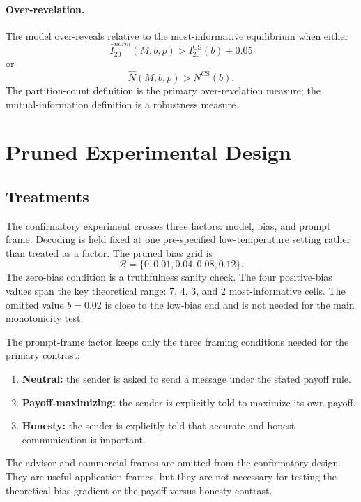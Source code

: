\documentclass[11pt]{article}
\newcommand{\calB}{\mathcal{B}}
\newcommand{\NCS}{N^{\mathrm{CS}}}
\newcommand{\ICS}{I^{\mathrm{CS}}}
\begin{document}
\paragraph{Over-revelation.}
The model over-reveals relative to the most-informative equilibrium when either
\begin{equation}
    \widehat I^{norm}_{20}(M,b,p)>\ICS_{20}(b)+0.05
\end{equation}
or
\begin{equation}
    \widehat N(M,b,p)>\NCS(b).
\end{equation}
The partition-count definition is the primary over-revelation measure; the mutual-information definition is a robustness measure.

\section{Pruned Experimental Design}\label{sec:design}

\subsection{Treatments}

The confirmatory experiment crosses three factors: model, bias, and prompt frame.  Decoding is held fixed at one pre-specified low-temperature setting rather than treated as a factor.  The pruned bias grid is
\begin{equation}
    \calB=\{0,0.01,0.04,0.08,0.12\}.
\end{equation}
The zero-bias condition is a truthfulness sanity check.  The four positive-bias values span the key theoretical range: $7$, $4$, $3$, and $2$ most-informative cells.  The omitted value $b=0.02$ is close to the low-bias end and is not needed for the main monotonicity test.

The prompt-frame factor keeps only the three framing conditions needed for the primary contrast:
\begin{enumerate}[leftmargin=*]
    \item \textbf{Neutral:} the sender is asked to send a message under the stated payoff rule.
    \item \textbf{Payoff-maximizing:} the sender is explicitly told to maximize its own payoff.
    \item \textbf{Honesty:} the sender is explicitly told that accurate and honest communication is important.
\end{enumerate}
The advisor and commercial frames are omitted from the confirmatory design.  They are useful application frames, but they are not necessary for testing the theoretical bias gradient or the payoff-versus-honesty contrast.
\end{document}
